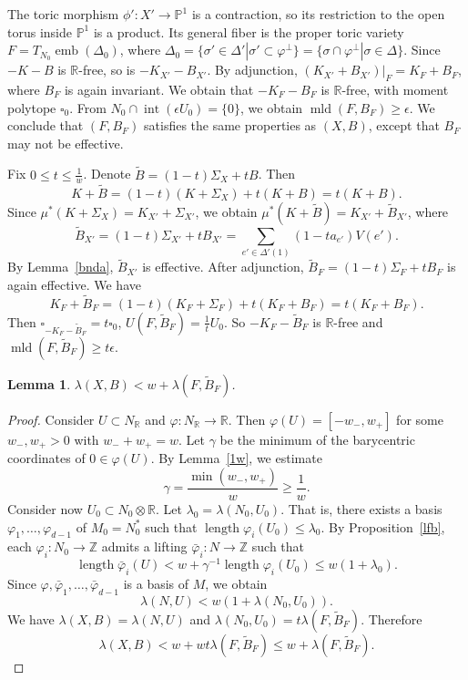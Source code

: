 \documentclass[12pt,twoside]{amsart}
\newcommand{\Z}{{\mathbb Z}}
\newcommand{\R}{{\mathbb R}}
\newcommand{\bP}{{\mathbb P}} %
\newcommand{\emb}{\operatorname{emb}}
\newcommand{\Int}{\operatorname{int}}
\newcommand{\length}{\operatorname{length}}
\newcommand{\mld}{\operatorname{mld}}
\theoremstyle{plain}
\newtheorem{lem}[thm]{Lemma}
\theoremstyle{definition}
\theoremstyle{remark}
\begin{document}
The toric morphism $\phi'\colon X'\to \bP^1$ is a contraction, so its restriction to the open torus
inside $\bP^1$ is a product. Its general fiber is the proper 
toric variety $F=T_{N_0}\emb(\Delta_0)$, where 
$\Delta_0=\{\sigma'\in \Delta' |\sigma'\subset \varphi^\perp\}=\{\sigma\cap \varphi^\perp | \sigma\in \Delta\}$.
Since $-K-B$ is $\R$-free, so is $-K_{X'}-B_{X'}$. By adjunction,
$(K_{X'}+B_{X'})|_F=K_F+B_F$, where $B_F$ is again invariant.
We obtain that $-K_F-B_F$ is $\R$-free, with moment polytope $\square_0$.
From $N_0 \cap \Int(\epsilon U_0)=\{0\}$, we obtain $\mld(F,B_F)\ge \epsilon$.
We conclude that $(F,B_F)$ satisfies the same properties as $(X,B)$, except that 
$B_F$ may not be effective.

Fix $0\le t\le \frac{1}{w}$. Denote $\tilde{B}=(1-t)\Sigma_X+tB$.
Then 
$$
K+\tilde{B}=(1-t)(K+\Sigma_X)+t(K+B)=t(K+B).
$$
Since $\mu^*(K+\Sigma_X)=K_{X'}+\Sigma_{X'}$, we obtain 
$\mu^*(K+\tilde{B})=K_{X'}+\tilde{B}_{X'}$, where 
$$
\tilde{B}_{X'}=(1-t)\Sigma_{X'}+t B_{X'}=\sum_{e'\in \Delta'(1)}(1-ta_{e'})V(e').
$$
By Lemma~\ref{bnda}, $\tilde{B}_{X'}$ is effective.
After adjunction, $\tilde{B}_F=(1-t)\Sigma_F+t B_F$ is again effective. We have 
$$
K_F+\tilde{B}_F=(1-t)(K_F+\Sigma_F)+t(K_F+B_F)=t(K_F+B_F).
$$
Then $\square_{-K_F-\tilde{B}_F}=t \square_0$, $U(F,\tilde{B}_F)=\frac{1}{t} U_0$.
So $-K_F-\tilde{B}_F$ is $\R$-free and $\mld(F,\tilde{B}_F)\ge t\epsilon$.

\begin{lem}\label{indb}
	$\lambda(X,B)<w+\lambda(F,\tilde{B}_F)$.
\end{lem}

\begin{proof} Consider $U\subset N_\R$ and $\varphi\colon N_\R\to \R$.
	Then $\varphi(U)=[-w_-,w_+]$ for some $w_-,w_+>0$ with $w_-+w_+=w$. Let $\gamma$
	be the minimum of the barycentric coordinates of $0\in \varphi(U)$. By Lemma~\ref{1w},
	we estimate 
	$$
	\gamma=\frac{\min(w_-,w_+)}{w}\ge \frac{1}{w}.
	$$
	Consider now $U_0\subset N_0\otimes \R$. Let $\lambda_0=\lambda(N_0,U_0)$.
	That is, there exists a basis $\varphi_1,\ldots,\varphi_{d-1}$ of $M_0=N_0^*$ such
	that $\length \varphi_i(U_0)\le \lambda_0$. By Proposition~\ref{lfb}, each 
	$\varphi_i\colon N_0\to \Z$ admits a lifting $\bar{\varphi}_i\colon N\to \Z$
	such that 
	$$
	\length \bar{\varphi}_i(U)<w+\gamma^{-1}\length \varphi_i(U_0) \le w(1+\lambda_0).
	$$ 
	Since $\varphi,\bar{\varphi}_1,\ldots,\bar{\varphi}_{d-1}$ is a basis of $M$, we obtain 
	$$
	\lambda(N,U)<w(1+\lambda(N_0,U_0)).
	$$
	We have $\lambda(X,B)=\lambda(N,U)$ and $\lambda(N_0,U_0)=t\lambda(F,\tilde{B}_F)$.
	Therefore
	$$
	\lambda(X,B)<w+wt\lambda(F,\tilde{B}_F)\le w+\lambda(F,\tilde{B}_F).
	$$
\end{proof}
\end{document}
